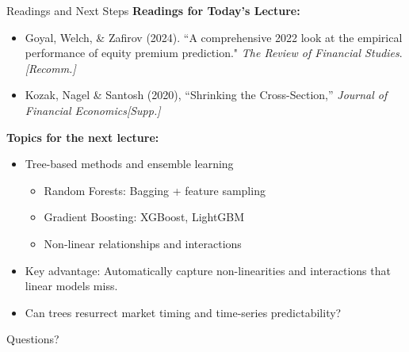 \documentclass[10pt]{beamer}
\begin{document}
\begin{frame}{Readings and Next Steps}
  \textbf{Readings for Today's Lecture:}
  \begin{itemize}
    \item Goyal, Welch, \& Zafirov (2024). ``A comprehensive 2022 look at the empirical performance of equity premium prediction." \emph{The Review of Financial Studies}.\hfill \textit{[Recomm.]}
    \item Kozak, Nagel \& Santosh (2020), ``Shrinking the Cross-Section,'' \emph{Journal of Financial Economics}\hfill \textit{[Supp.]}
  \end{itemize}
  \vspace{1em}
  
  \textbf{Topics for the next lecture:}

\vspace{1em}
\begin{itemize}
  \item Tree-based methods and ensemble learning
\begin{itemize}
  \item Random Forests: Bagging + feature sampling
  \item Gradient Boosting: XGBoost, LightGBM
  \item Non-linear relationships and interactions
\end{itemize}
\item Key advantage: Automatically capture non-linearities and interactions that linear models miss.

\item Can trees resurrect market timing and time-series predictability? 
\end{itemize}
  \end{frame}

\begin{frame}[plain]
  \centering
  \vfill
  {\Large Questions?}
  \vfill
\end{frame}






\end{document}
